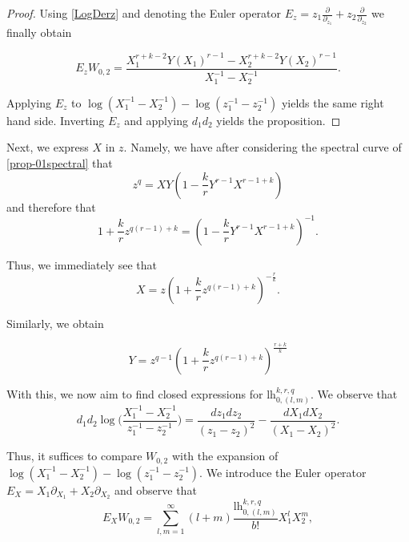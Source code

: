 \documentclass[10pt,a4paper,oneside,no-math,reqno]{amsart}%
\theoremstyle{plain}
\theoremstyle{definition}
\theoremstyle{remark}
\numberwithin{equation}{section}
\newcommand{\1}{\mathds{1}}
\newcommand{\<}{\langle}
\renewcommand{\>}{\rangle}
\newcommand{\lh}{\mathord{\mathrm{l\!h}}}
\begin{document}
\begin{proof}
    Using \cref{LogDerz} and denoting the Euler operator $E_z = z_1 \frac{\partial}{\partial_{z_1}} + z_2\frac{\partial}{\partial_{z_2}}$ we finally obtain

    \begin{equation}
        E_zW_{0,2}=\frac{X_1^{r+k-2} Y(X_1)^{r-1} - X_2^{r+k-2} Y(X_2)^{r-1}}{X_1^{-1} - X_2^{-1}}.
    \end{equation}

    Applying $E_z$ to $\log (X_1^{-1} - X_2^{-1}) - \log (z_1^{-1} - z_2^{-1})$ yields the same right hand side. Inverting $E_z$ and applying $d_1d_2$ yields the proposition.
\end{proof}



Next, we express $X$ in $z$. Namely, we have after considering the spectral curve of \cref{prop-01spectral} that
\begin{equation}
    z^q=XY(1-\frac{k}{r}Y^{r-1}X^{r-1+k})
\end{equation}
and therefore that
\begin{equation}
    1+\frac{k}{r}z^{q(r-1)+k}
    =
    (1-\frac{k}{r} Y^{r-1}X^{r-1+k})^{-1}.
\end{equation}

Thus, we immediately see that
\begin{equation}
\label{equ-xviaz}
    X
    =
    z(1+\frac{k}{r}z^{q(r-1)+k})^{-\frac{r}{k}}.
\end{equation}

Similarly, we obtain

\begin{equation}
\label{equ-yviaz}
    Y
    =
    z^{q-1}(1+\frac{k}{r}z^{q(r-1)+k})^{\frac{r+k}{k}}
\end{equation}




With this, we now aim to find closed expressions for $\lh_{0,(l,m)}^{k,r,q}$. We observe that
\begin{equation}
    d_1 d_2 \log \big( \frac{X_1^{-1} - X_2^{-1}}{z_1^{-1} - z_2^{-1}} \big)
    =
    \frac{dz_1 dz_2}{(z_1 - z_2)^2} - \frac{dX_1 dX_2}{(X_1 - X_2)^2}.
\end{equation}

Thus, it suffices to compare $W_{0,2}$ with the expansion of $\log ( X_1^{-1} - X_2^{-1}) - \log ( z_1^{-1} - z_2^{-1} ) $. We introduce the Euler operator $E_X = X_1 \partial_{X_1} + X_2 \partial_{X_2} $ and observe that
\begin{equation}
    E_X W_{0,2}
    =
    \sum_{l,m=1}^\infty (l+m) \frac{\lh_{0,(l,m)}^{k,r,q}}{b!} X_1^l X_2^m,
\end{equation}
\end{document}
